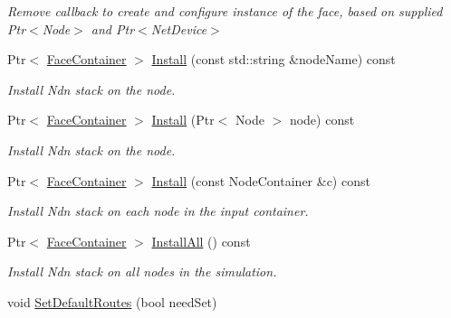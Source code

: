 \begin{DoxyCompactItemize}
\begin{DoxyCompactList}\small\item\em Remove callback to create and configure instance of the face, based on supplied Ptr$<$\+Node$>$ and Ptr$<$\+Net\+Device$>$ \end{DoxyCompactList}\item 
Ptr$<$ \hyperlink{classns3_1_1ndn_1_1FaceContainer}{Face\+Container} $>$ \hyperlink{classns3_1_1ndn_1_1StackHelper_ab9530802eb64615cc458efeb75949d2e}{Install} (const std\+::string \&node\+Name) const
\begin{DoxyCompactList}\small\item\em Install Ndn stack on the node. \end{DoxyCompactList}\item 
Ptr$<$ \hyperlink{classns3_1_1ndn_1_1FaceContainer}{Face\+Container} $>$ \hyperlink{classns3_1_1ndn_1_1StackHelper_a4fa731f2371c5b19161e7a83d0e73e21}{Install} (Ptr$<$ Node $>$ node) const
\begin{DoxyCompactList}\small\item\em Install Ndn stack on the node. \end{DoxyCompactList}\item 
Ptr$<$ \hyperlink{classns3_1_1ndn_1_1FaceContainer}{Face\+Container} $>$ \hyperlink{classns3_1_1ndn_1_1StackHelper_ae560bd6234e284fe64fb53f055293bbb}{Install} (const Node\+Container \&c) const
\begin{DoxyCompactList}\small\item\em Install Ndn stack on each node in the input container. \end{DoxyCompactList}\item 
Ptr$<$ \hyperlink{classns3_1_1ndn_1_1FaceContainer}{Face\+Container} $>$ \hyperlink{classns3_1_1ndn_1_1StackHelper_af412d619fdb1785048e716de8787e4b2}{Install\+All} () const
\begin{DoxyCompactList}\small\item\em Install Ndn stack on all nodes in the simulation. \end{DoxyCompactList}\item 
void \hyperlink{classns3_1_1ndn_1_1StackHelper_a12b1c8f16bad953ac3b9bb4a6ab1fcab}{Set\+Default\+Routes} (bool need\+Set)\hypertarget{classns3_1_1ndn_1_1StackHelper_a12b1c8f16bad953ac3b9bb4a6ab1fcab}{}\label{classns3_1_1ndn_1_1StackHelper_a12b1c8f16bad953ac3b9bb4a6ab1fcab}


\end{DoxyCompactItemize}
